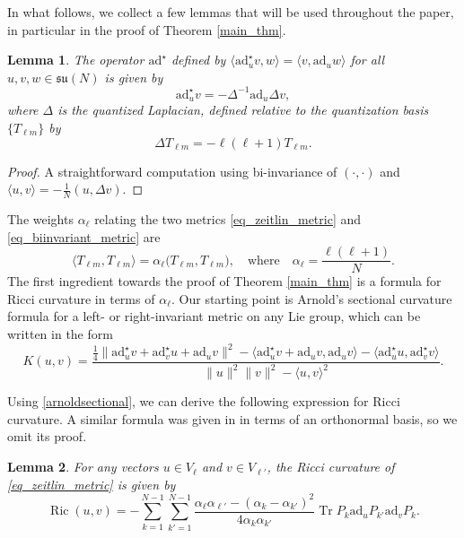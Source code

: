 \documentclass[11pt]{amsart}
\numberwithin{equation}{section}
\newtheorem{lemma}{Lemma}
\theoremstyle{definition}
\DeclareMathOperator{\Tr}{Tr}
\newcommand{\ad}{\mathrm{ad}}
\newcommand{\adstar}{\ad^{\star}}
\DeclareMathOperator{\Ric}{Ric}
\newcommand{\weight}{\alpha}
\begin{document}
In what follows, we collect a few lemmas that will be used throughout the paper, in particular in the proof of Theorem \ref{main_thm}.

\begin{lemma}\label{covderivprop}
The operator $\adstar$ defined by $\langle \adstar_uv, w\rangle = \langle v, \ad_uw\rangle$ for all $u,v,w\in \mathfrak{su}(N)$ is given by 
\begin{equation}\label{adstar}
\adstar_uv = -\Delta^{-1}\ad_u\Delta v,
\end{equation}
where $\Delta$ is the quantized Laplacian, defined relative to the quantization basis $\{T_{\ell m}\}$ by
\begin{equation}
\Delta T_{\ell m} = -\ell(\ell+1)T_{\ell m}.
\end{equation}
\end{lemma}


\begin{proof}
A straightforward computation using bi-invariance of $(\cdot, \cdot)$ and  $\langle u, v\rangle = -\tfrac{1}{N}(u, \Delta v)$. 
\end{proof}
The weights $\alpha_{\ell}$ relating the two metrics \eqref{eq_zeitlin_metric} and \eqref{eq_biinvariant_metric} are 
\begin{equation}\label{definition_alpha}
\langle T_{\ell m}, T_{\ell m} \rangle = \alpha_{\ell}\big(T_{\ell m}, T_{\ell m}\big), \quad \text{where} \quad \alpha_{\ell} = \frac{\ell(\ell+1)}{N}.
\end{equation}
The first ingredient towards the proof of Theorem \ref{main_thm} is a formula for Ricci curvature in terms of  $\weight_{\ell}$. Our starting point is Arnold's sectional curvature formula for a left- or right-invariant metric on any Lie group, which can be written in the form 
\begin{equation}\label{arnoldsectional}
K(u,v) = \frac{\frac{1}{4} \| \adstar_uv + \adstar_vu + \ad_uv \|^2 -  \langle \adstar_uv + \ad_uv, \ad_uv\rangle - \langle \adstar_uu, \adstar_vv\rangle}{\|u\|^2 \|v\|^2-\langle u,v\rangle^2}.
\end{equation}

Using \eqref{arnoldsectional}, we can derive the following expression for Ricci curvature. A similar formula was given in \cite{krishnan2021diagonal} in terms of an orthonormal basis, so we omit its proof. 
\begin{lemma}\label{simplifiedricci}
For any vectors $u\in V_{\ell}$ and $v\in V_{\ell'}$,  
the Ricci curvature of \eqref{eq_zeitlin_metric} is given by 
\begin{equation}\label{riccisymmetrized}
\Ric(u,v) = -\sum_{k=1}^{N-1} \sum_{k'=1}^{N-1} \frac{\weight_{\ell}\weight_{\ell'} - (\weight_{k}-\weight_{k'})^2}{4\weight_{k}\weight_{k'}} \Tr
{P_{k}\ad_u P_{k'}\ad_v P_{k}}.
\end{equation}
\end{lemma}
\end{document}
